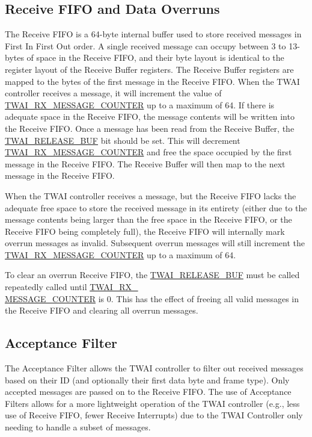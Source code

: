 \documentclass[main\_\_EN.tex]{subfiles}
\begin{document}
\subsection{Receive FIFO and Data Overruns}

The Receive FIFO is a 64-byte internal buffer used to store received messages in First In First Out order. A single received message can occupy between 3 to 13-bytes of space in the Receive FIFO, and their byte layout is identical to the register layout of the Receive Buffer registers. The Receive Buffer registers are mapped to the bytes of the first message in the Receive FIFO.
When the TWAI controller receives a message, it will increment the value of \hyperref[fielddesc:TWAIRXMESSAGECOUNTER]{TWAI\_RX\_MESSAGE\_COUNTER} up to a maximum of 64. If there is adequate space in the Receive FIFO, the message contents will be written into the Receive FIFO. Once a message has been read from the Receive Buffer, the \hyperref[fielddesc:TWAIRELEASEBUF]{TWAI\_RELEASE\_BUF} bit should be set. This will decrement \hyperref[fielddesc:TWAIRXMESSAGECOUNTER]{TWAI\_RX\_MESSAGE\_COUNTER} and free the space occupied by the first message in the Receive FIFO. The Receive Buffer will then map to the next message in the Receive FIFO.

When the TWAI controller receives a message, but the Receive FIFO lacks the adequate free space to store the received message in its entirety (either due to the message contents being larger than the free space in the Receive FIFO, or the Receive FIFO being completely full), the Receive FIFO will internally mark overrun messages as invalid. Subsequent overrun messages will still increment the  \hyperref[fielddesc:TWAIRXMESSAGECOUNTER]{TWAI\_RX\_MESSAGE\_COUNTER} up to a maximum of 64.

To clear an overrun Receive FIFO, the \hyperref[fielddesc:TWAIRELEASEBUF]{TWAI\_RELEASE\_BUF} must be called repeatedly called until \hyperref[fielddesc:TWAIRXMESSAGECOUNTER]{TWAI\_RX\_\\MESSAGE\_COUNTER} is 0. This has the effect of freeing all valid messages in the Receive FIFO and clearing all overrun messages.

\subsection{Acceptance Filter}

The Acceptance Filter allows the TWAI controller to filter out received messages based on their ID (and optionally their first data byte and frame type). Only accepted messages are passed on to the Receive FIFO. The use of Acceptance Filters allows for a more lightweight operation of the TWAI controller (e.g., less use of Receive FIFO, fewer Receive Interrupts) due to the TWAI Controller only needing to handle a subset of messages.
\end{document}
